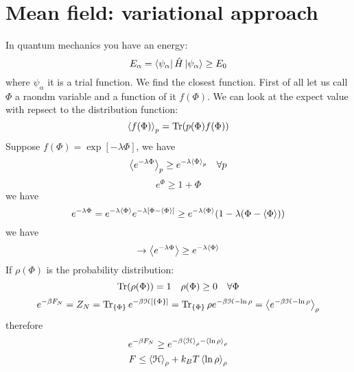 \documentclass[../main/main.tex]{subfiles}
\begin{document}
\section{Mean field: variational approach}
In quantum mechanics you have an energy:
\begin{equation}
  E_{\alpha } = \bra{\psi _ \alpha } \hat{H} \ket{\psi _ \alpha } \ge E_0
\end{equation}
where \( \psi _ \alpha  \) it is a trial function. We find the closest function. First of all let us call \( \Phi  \)  a raondm variable and a function of it \( f(\Phi ) \). We can look at the expect value with repsect to the distribution function:
\begin{equation}
  \expval{f(\Phi )}_{p } = \Tr(p(\Phi )f(\Phi ))
\end{equation}
Suppose \( f(\Phi ) = \exp [-\lambda \Phi ]  \), we have
\begin{equation}
  \expval{e^{-\lambda \Phi } }_p \ge e^{- \lambda \expval{\Phi }_p } \quad \forall p
\end{equation}
\begin{equation}
 e^{\Phi } \ge 1+\Phi
\end{equation}
we have
\begin{equation}
  e^{-\lambda \Phi } = e^{- \lambda \expval{\Phi } } e^{- \lambda [\Phi - \expval{\Phi } ]}
  \ge e^{-\lambda \expval{\Phi }  } (1- \lambda (\Phi - \expval{\Phi} ))
\end{equation}
we have
\begin{equation}
 \rightarrow   \expval{e^{-\lambda \Phi }}  \ge e^{-\lambda \expval{\Phi } }
\end{equation}
If \( \rho (\Phi ) \) is the probability distribution:
\begin{equation}
  \Tr(\rho (\Phi )) = 1 \quad \rho (\Phi ) \ge 0 \quad \forall \Phi
   \label{eq:12_2}
\end{equation}
\begin{equation}
  e^{-\beta F_N} = Z_N = \Tr_{\{ \Phi  \}  } e^{-\beta \mathcal{H}[\{ \Phi \}  ]}
                = \Tr_{\{ \Phi  \}  } \rho e^{-\beta \mathcal{H}-\ln{\rho } }
                = \expval{e^{-\beta \mathcal{H}- \ln{\rho } } }_\rho
\end{equation}
therefore
\begin{equation}
  e^{-\beta F_N} \ge e^{-\beta \expval{\mathcal{H}}_\rho - \expval{\ln{\rho } }_\rho  }
\end{equation}
\begin{equation}
  F \le \expval{\mathcal{H}}_\rho + k_B T \expval{\ln{\rho } }_\rho
  \label{eq:12_3}
\end{equation}
\end{document}

